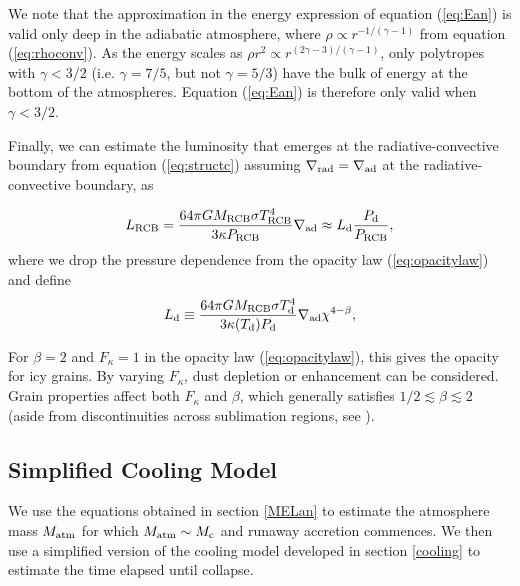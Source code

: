 \documentclass[apj]{emulateapj}
\newcommand{\delad}{\nabla_{\rm ad}}
\newcommand{\delrad}{\nabla_{\rm rad}}
\newcommand{\co}{_{\rm c}}
\newcommand{\di}{_{\rm d}}
\newcommand{\cb}{_{\rm RCB}}
\begin{document}
We note that the approximation in the energy expression of equation (\ref{eq:Ean}) is valid only deep in the adiabatic atmosphere, where  $\rho \propto r^{-1/(\gamma -1)}$ from equation (\ref{eq:rhoconv}).  As the energy scales as $\rho r^2 \propto r^{(2\gamma -3)/(\gamma - 1)}$, only polytropes with $\gamma < 3/2$ (i.e. $\gamma = 7/5$, but not $\gamma = 5/3$) have the bulk of energy at the bottom of the atmospheres.  Equation (\ref{eq:Ean}) is therefore only valid when $\gamma<3/2$. %

Finally, we can estimate the luminosity that emerges at the radiative-convective boundary from equation (\ref{eq:structc}) assuming $\delrad=\delad$ at the radiative-convective boundary, as

\begin{equation} \label{eq:Lcb}
L\cb = {64 \pi G M\cb \sigma T\cb^4 \over 3 \kappa P\cb } \nabla_{\rm ad} \approx L\di {P_{\rm d} \over P\cb}, %
\end{equation} 
where we drop the pressure dependence from the opacity law (\ref{eq:opacitylaw}) and define 
\begin{equation} 
L\di \equiv {64 \pi G M\cb \sigma T_{\rm d}^4 \over 3 \kappa(T_{\rm d}) P_{\rm d}} \nabla_{\rm ad}\chi^{4-\beta}, 
\end{equation} 

 For $\beta = 2$ and $F_\kappa = 1$ in the opacity law (\ref{eq:opacitylaw}), this gives the \citet{bell94} opacity for icy grains.  By varying $F_\kappa$, dust depletion or enhancement can be considered.  Grain properties affect both $F_\kappa$ and $\beta$, which generally satisfies  $1/2 \lesssim \beta \lesssim 2$ (aside from discontinuities across sublimation regions, see \citealt{semenov03}).







\subsection{Simplified Cooling Model}
\label{coolingan}

We use the equations obtained in section \ref{MELan} to estimate the atmosphere mass $M_{\rm{atm}}$ for which $M_{\rm{atm}} \sim M\co$ and runaway accretion commences. We then use a simplified version of the cooling model developed in section \ref{cooling} to estimate the time elapsed until collapse. 
\end{document}
